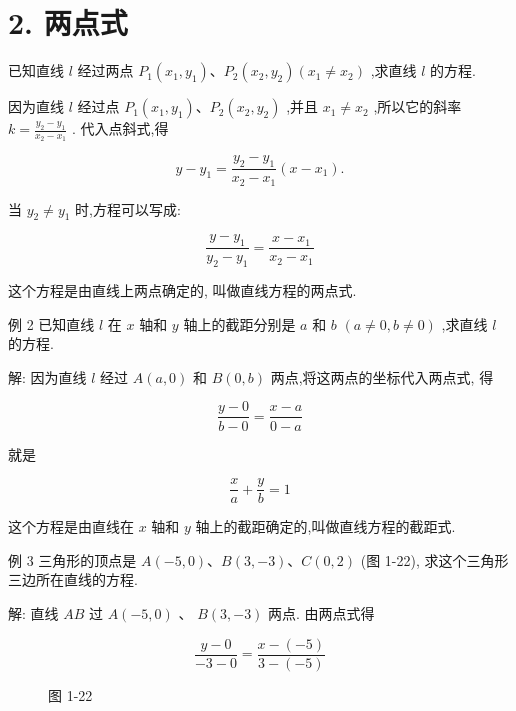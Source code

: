 \documentclass[lang=cn,newtx,12pt,scheme=chinese]{elegantbook}
\begin{document}
\section*{2. 两点式}

已知直线 \(l\) 经过两点 \({P}_{1}\left( {{x}_{1},{y}_{1}}\right) \text{、}{P}_{2}\left( {{x}_{2},{y}_{2}}\right) \left( {{x}_{1} \neq {x}_{2}}\right)\) ,求直线 \(l\) 的方程.

因为直线 \(l\) 经过点 \({P}_{1}\left( {{x}_{1},{y}_{1}}\right) \text{、}{P}_{2}\left( {{x}_{2},{y}_{2}}\right)\) ,并且 \({x}_{1} \neq {x}_{2}\) ,所以它的斜率 \(k = \frac{{y}_{2} - {y}_{1}}{{x}_{2} - {x}_{1}}\) . 代入点斜式,得

\[
  y - {y}_{1} = \frac{{y}_{2} - {y}_{1}}{{x}_{2} - {x}_{1}}\left( {x - {x}_{1}}\right) .
\]
\begin{corollary}[两点式]
当 \({y}_{2} \neq {y}_{1}\) 时,方程可以写成:

\[
  \frac{y - {y}_{1}}{{y}_{2} - {y}_{1}} = \frac{x - {x}_{1}}{{x}_{2} - {x}_{1}}
\]

这个方程是由直线上两点确定的, 叫做直线方程的两点式.
\end{corollary}
例 2 已知直线 \(l\) 在 \(x\) 轴和 \(y\) 轴上的截距分别是 \(a\) 和 \(b\) \(\left( {a \neq 0,b \neq 0}\right)\) ,求直线 \(l\) 的方程.

解: 因为直线 \(l\) 经过 \(A\left( {a,0}\right)\) 和 \(B\left( {0,b}\right)\) 两点,将这两点的坐标代入两点式, 得

\[
  \frac{y - 0}{b - 0} = \frac{x - a}{0 - a}
\]

就是
\begin{corollary}[截距式]
\[
  \frac{x}{a} + \frac{y}{b} = 1
\]

这个方程是由直线在 \(x\) 轴和 \(y\) 轴上的截距确定的,叫做直线方程的截距式.
\end{corollary}
例 3 三角形的顶点是 \(A\left( {-5,0}\right) \text{、}B\left( {3, - 3}\right) \text{、}C\left( {0,2}\right)\) (图 1-22), 求这个三角形三边所在直线的方程.

解: 直线 \({AB}\) 过 \(A\left( {-5,0}\right)\) 、 \(B\left( {3, - 3}\right)\) 两点. 由两点式得

\[
  \frac{y - 0}{-3 - 0} = \frac{x - \left( {-5}\right) }{3 - \left( {-5}\right) }
\]

\begin{figure}[h]
  \centering
  
  \caption{图 1-22}
\end{figure}
\end{document}
